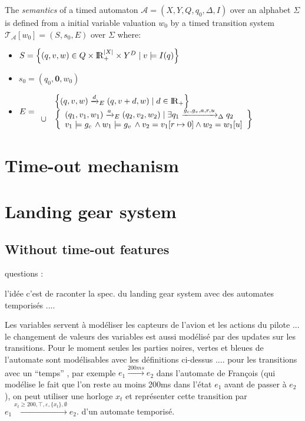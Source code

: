 \documentclass[a4paper,10pt]{article}
\def\A{\ensuremath{\mathcal{A}}}
\def\T{\ensuremath{\mathcal{T}}}
\def\bbbr{{\rm I\!R }}
\begin{document}
The \emph{semantics} of a timed automaton $\A=(X,Y,Q,q_0,\Delta,I)$
over an alphabet $\Sigma$ is defined from a initial variable valuation $w_0$
by a timed transition system
$\T_{\A}[w_0] = (S,s_0,E)$ over $\Sigma$ where:
\begin{itemize}
\item $S = \left \{ (q,v,w) \in Q \times \bbbr_{+}^{|X|}  \times
    Y^D \mid v \models I(q) \right \}$
\item $s_0 = (q_0,\mathbf{0},w_0)$
\item $E = \begin{array}{ll}
& \left \{ 
(q,v,w) \xrightarrow{d}_E (q,v+d,w) \mid d \in \bbbr_+ 
\right \} \\
\cup & 
\left \{ \begin{array}{l}
(q_1,v_1,w_1) \xrightarrow{a}_E (q_2,v_2,w_2) \mid  
\exists q_1 \xrightarrow{g_c,g_v,a,r,u}_{\Delta} q_2 \\
v_1 \models g_c \, \land w_1 \models g_v \, \land v_2 = v_1[r \mapsto
0] \land w_2 = w_1[u]
\end{array}
\right \}
\\
\end{array}$
\end{itemize}

\section{Time-out mechanism}




\section{Landing gear system}

\subsection{Without time-out features}

questions :

l'id\'ee c'est de raconter la spec. du landing gear system avec des
automates temporis\'es ....

Les variables servent \`a mod\'eliser les capteurs de l'avion et les
actions du pilote ... le changement de valeurs des variables est aussi
mod\'elis\'e par des updates sur les transitions. Pour le
moment seules les parties noires, vertes et bleues de l'automate sont
mod\'elisables avec les d\'efinitions ci-dessus .... pour les
transitions avec un ``temps'' , par exemple $e_1 \xrightarrow{200ms}
e_2$ dans l'automate de Fran\c{c}ois (qui mod\'elise le fait que
l'on reste au moins 200ms dans l'\'etat $e_1$ avant de passer \`a
$e_2$), on peut utiliser une horloge $x_t$ et repr\'esenter cette
transition par
$e_1 \xrightarrow{x_t \geq 200 , \top , \varepsilon , \{ x_t \},\emptyset} e_2$.
d'un automate temporis\'e.






\end{document}
